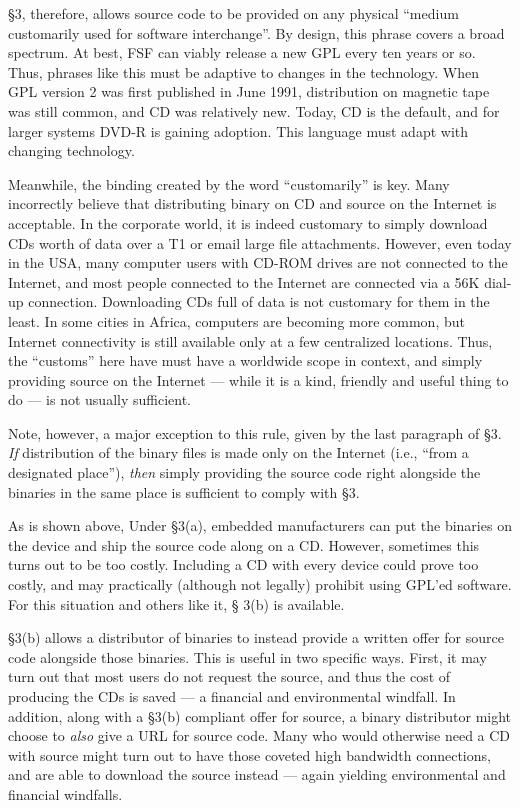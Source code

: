 \documentclass[12pt]{report}
\begin{document}
\S 3, therefore, allows source code to be provided on any physical
``medium customarily used for software interchange''.  By design, this
phrase covers a broad spectrum.  At best, FSF can viably release a new GPL
every ten years or so.  Thus, phrases like this must be adaptive to
changes in the technology.  When GPL version 2 was first published in June
1991, distribution on magnetic tape was still common, and CD was
relatively new.  Today, CD is the default, and for larger systems DVD-R is
gaining adoption.  This language must adapt with changing technology.

Meanwhile, the binding created by the word ``customarily'' is key.  Many
incorrectly believe that distributing binary on CD and source on the
Internet is acceptable.  In the corporate world, it is indeed customary to
simply download CDs worth of data over a T1 or email large file
attachments.  However, even today in the USA, many computer users with
CD-ROM drives are not connected to the Internet, and most people connected
to the Internet are connected via a 56K dial-up connection.  Downloading
CDs full of data is not customary for them in the least.  In some cities
in Africa, computers are becoming more common, but Internet connectivity
is still available only at a few centralized locations.  Thus, the
``customs'' here have must have a worldwide scope in context, and simply
providing source on the Internet --- while it is a kind, friendly and
useful thing to do --- is not usually sufficient.

Note, however, a major exception to this rule, given by the last paragraph
of \S 3.  \emph{If} distribution of the binary files is made only on the
Internet (i.e., ``from a designated place''), \emph{then} simply providing
the source code right alongside the binaries in the same place is
sufficient to comply with \S 3.

\medskip

As is shown above, Under \S 3(a), embedded manufacturers can put the
binaries on the device and ship the source code along on a CD\@.  However,
sometimes this turns out to be too costly.  Including a CD with every
device could prove too costly, and may practically (although not legally)
prohibit using GPL'ed software.  For this situation and others like it, \S
3(b) is available.

\S 3(b) allows a distributor of binaries to instead provide a written
offer for source code alongside those binaries.  This is useful in two
specific ways.  First, it may turn out that most users do not request the
source, and thus the cost of producing the CDs is saved --- a financial
and environmental windfall.  In addition, along with a \S 3(b) compliant
offer for source, a binary distributor might choose to \emph{also} give a
URL for source code.  Many who would otherwise need a CD with source might
turn out to have those coveted high bandwidth connections, and are able to
download the source instead --- again yielding environmental and financial
windfalls.
\end{document}
